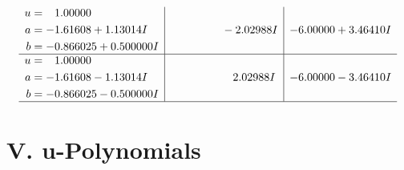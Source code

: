 \documentclass[1p]{elsarticle_modified}
\theoremstyle{definition}
\begin{document}
$$\begin{array}{c|c|c}
\begin{aligned}
u &= \phantom{-}1.00000\phantom{ +0.000000I} \\
a &= -1.61608 + 1.13014 I \\
b &= -0.866025 + 0.500000 I\end{aligned}
 & \phantom{-0.000000 } -2.02988 I & -6.00000 + 3.46410 I \\ \hline\begin{aligned}
u &= \phantom{-}1.00000\phantom{ +0.000000I} \\
a &= -1.61608 - 1.13014 I \\
b &= -0.866025 - 0.500000 I\end{aligned}
 & \phantom{-0.000000 -}2.02988 I & -6.00000 - 3.46410 I\\
 \hline 
 \end{array}$$\newpage
\newpage\renewcommand{\arraystretch}{1}
\centering \section*{ V. u-Polynomials}
\end{document}
